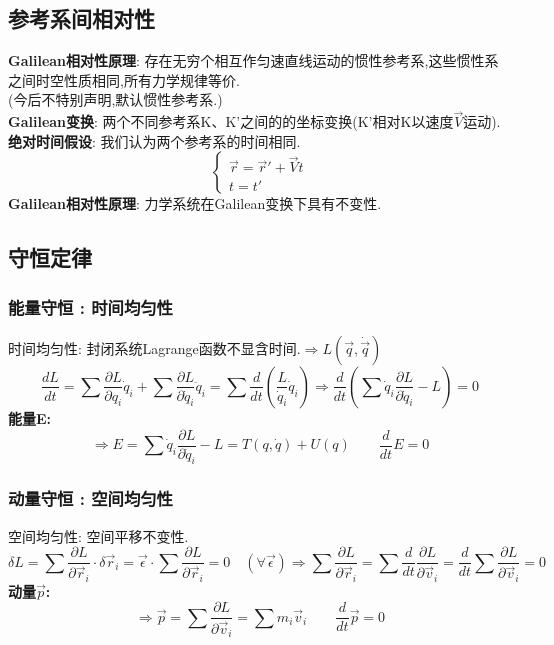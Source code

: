 \documentclass{article}
\begin{document}
\subsection{参考系间相对性}
\textbf{Galilean相对性原理}: 存在无穷个相互作匀速直线运动的惯性参考系,这些惯性系之间时空性质相同,所有力学规律等价.\\
(今后不特别声明,默认惯性参考系.)\\
\textbf{Galilean变换}: 两个不同参考系K、K'之间的的坐标变换(K'相对K以速度$\vec V$运动).\\
\textbf{绝对时间假设}: 我们认为两个参考系的时间相同.
\begin{displaymath}
    \left\{ \begin{array}{ll}
    \vec r = \vec r' + \vec V t\\
    t = t'
    \end{array} \right.
\end{displaymath}
\textbf{Galilean相对性原理}: 力学系统在Galilean变换下具有不变性.


\subsection{守恒定律}
\subsubsection{能量守恒 : 时间均匀性}
时间均匀性: 封闭系统Lagrange函数不显含时间.\quad$\Rightarrow L(\vec q,\dot \vec q)$\\
\[\frac{dL}{dt}
 = \sum \frac{\partial L}{\partial q_i} \dot q_i + \sum \frac{\partial L}{\partial \dot q_i} \ddot q_i
 = \sum \frac{d}{dt}(\frac{L}{\dot q_i}\dot q_i)
\Rightarrow \frac{d}{dt}(\sum \dot q_i \frac{\partial L}{\partial \dot q_i} - L) = 0\]
\textbf{能量E: }
\[\Rightarrow E = \sum \dot q_i \frac{\partial L}{\partial \dot q_i} - L
 = T(q,\dot q) + U(q)   \qquad \frac{d}{dt} E = 0\]


\subsubsection{动量守恒 : 空间均匀性}
空间均匀性: 空间平移不变性.\\
\[\delta L = \sum \frac{\partial L}{\partial \vec r_i}\cdot \delta \vec r_i
 = \vec \epsilon \cdot \sum \frac{\partial L}{\partial \vec r_i} = 0\quad(\forall \vec \epsilon)
\Rightarrow \sum \frac{\partial L}{\partial \vec r_i}
 = \sum \frac{d}{dt} \frac{\partial L}{\partial \vec v_i}
 = \frac{d}{dt} \sum \frac{\partial L}{\partial \vec v_i} = 0\]
\textbf{动量$\vec p$: }
\[\Rightarrow \vec p = \sum \frac{\partial L}{\partial \vec v_i} = \sum m_i \vec v_i  \qquad \frac{d}{dt}\vec p = 0\]
\end{document}
